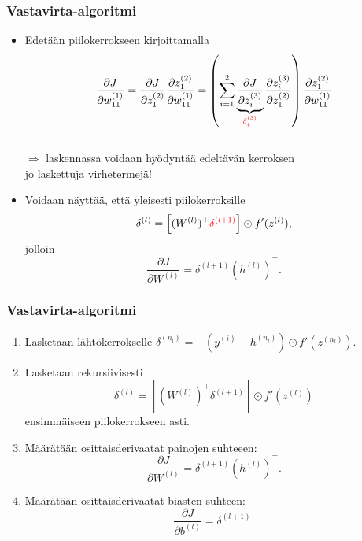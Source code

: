 \documentclass{beamer} %
\theoremstyle{definition}
\begin{document}
\begin{frame}\frametitle{Vastavirta-algoritmi}
\begin{itemize}
\item Edetään piilokerrokseen kirjoittamalla \[\frac{\partial J}{\partial w_{11}^{(1)}}=\frac{\partial J}{\partial z_1^{(2)}}\frac{\partial z_1^{(2)}}{\partial w_{11}^{(1)}}=\left(\sum_{i=1}^{2} \underbrace{\frac{\partial J}{\partial z_i^{(3)}}}_{\textcolor{red}{\delta_i^{(3)}}}\frac{\partial z_i^{(3)}}{\partial z_1^{(2)}}\right)\frac{\partial z_1^{(2)}}{\partial w_{11}^{(1)}}\]
\\ \(\Rightarrow\) laskennassa voidaan hyödyntää \alert{edeltävän kerroksen}\\\hspace{0.2in}jo laskettuja virhetermejä!

\item Voidaan näyttää, että yleisesti piilokerroksille \[\delta^{(l)}=\left[(W^{(l)})^{\top} \textcolor{red}{\delta^{(l+1)}}\right]\odot f'(z^{(l)}),\] jolloin \[\frac{\partial J}{\partial W^{(l)}}=\delta^{(l+1)}(h^{(l)})^{\top}.\]

\end{itemize}
\end{frame}

\begin{frame}\frametitle{Vastavirta-algoritmi}
\begin{enumerate}
    \item Lasketaan lähtökerrokselle \(\delta^{(n_l)}=-(y^{(i)}-h^{(n_l)})\odot f'(z^{(n_l)})\).
    \item Lasketaan rekursiivisesti \[\delta^{(l)}=\left[(W^{(l)})^{\top}\delta^{(l+1)}\right] \odot f'(z^{(l)})\] ensimmäiseen piilokerrokseen asti.
    \item Määrätään osittaisderivaatat painojen suhteeen: \[\displaystyle \frac{\partial J}{\partial W^{(l)}}=\delta^{(l+1)} (h^{(l)})^{\top}.\]
    \item Määrätään osittaisderivaatat biasten suhteen: \[\frac{\partial J}{\partial b^{(l)}}=\delta^{(l+1)}.\]
\end{enumerate}
\end{frame}
\end{document}
